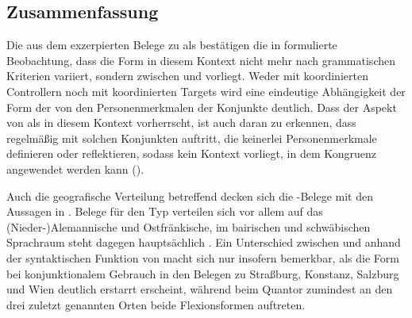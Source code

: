 
\subsection{Zusammenfassung}

Die aus dem \CAO{} exzerpierten Belege zu  als 
bestätigen die in \citet[626--627]{ksw2} formulierte
Beobachtung, dass die Form in diesem Kontext nicht mehr nach grammatischen
Kriterien variiert, sondern  zwischen  und
 vorliegt. Weder mit koordinierten Controllern noch
mit koordinierten Targets wird eine eindeutige Abhängigkeit der Form
der  von den Personenmerkmalen der
Konjunkte deutlich. Dass der Aspekt von  als
 \autocites(siehe auch
)[425--428]{johannessen2005} in diesem Kontext
vorherrscht, ist auch daran zu erkennen, dass  regelmäßig mit
solchen Konjunkten auftritt, die keinerlei Personenmerkmale definieren oder
reflektieren, sodass kein Kontext vorliegt, in dem Kongruenz angewendet werden
kann ().

Auch die geografische Verteilung betreffend
decken sich die \CAO{}-Belege mit den Aussagen in
\citet[627--628]{ksw2}. Belege für den Typ  verteilen sich vor
allem auf das \mbox{(Nieder-)}\allowbreak{}Alemannische und
Ostfränkische, im bairischen und
schwäbischen Sprachraum steht dagegen
hauptsächlich . Ein Unterschied zwischen  und 
anhand der syntaktischen Funktion von  macht sich nur insofern
bemerkbar, als die Form bei konjunktionalem Gebrauch in den
Belegen zu Straßburg, Konstanz, Salzburg und Wien deutlich erstarrt erscheint,
während beim Quantor zumindest an den drei zuletzt genannten Orten beide
Flexionsformen auftreten.
